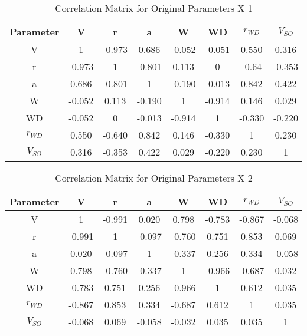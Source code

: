 \documentclass[11pt]{article} %
\begin{document}
\FloatBarrier
\begin{table}[hbt!]
\centering
\caption{ Correlation Matrix for Original Parameters X 1}
\begin{tabular}{c|c|c|c|c|c|c|c}
Parameter & V & r & a& W & WD& $r_{WD}$  &$ V_{SO}$\\
\hline
V & 1 & -0.973 &0.686 &-0.052 & -0.051 & 0.550 & 0.316\\
\hline
r & -0.973 & 1 & -0.801 & 0.113 & 0 &-0.64 & -0.353\\
\hline
a&0.686 & -0.801 & 1 & -0.190 & -0.013 & 0.842 &0.422\\
\hline
W&-0.052 &0.113 &-0.190 & 1 & -0.914 & 0.146 & 0.029\\
\hline
WD&-0.052 &0 & -0.013 & -0.914 & 1 & -0.330 & -0.220\\
\hline
$r_{WD}$&0.550 & -0.640 &  0.842 &0.146 & -0.330 & 1 & 0.230\\
\hline
$V_{SO}$&0.316&-0.353 & 0.422 &0.029 & -0.220 & 0.230  & 1
\end{tabular}
\end{table}
\FloatBarrier


\FloatBarrier
\begin{table}[hbt!]
\centering
\caption{ Correlation Matrix for Original Parameters X 2}
\begin{tabular}{c|c|c|c|c|c|c|c}
Parameter & V & r & a& W & WD& $r_{WD}$  &$ V_{SO}$\\
\hline
V & 1 & -0.991 &0.020 &0.798 & -0.783 & -0.867 & -0.068\\
\hline
r & -0.991 & 1 & -0.097 & -0.760 & 0.751 &0.853 & 0.069\\
\hline
a&0.020 & -0.097 & 1 & -0.337 & 0.256 & 0.334 &-0.058\\
\hline
W&0.798 &-0.760 &-0.337 & 1 & -0.966 & -0.687 & 0.032\\
\hline
WD&-0.783 &0.751 & 0.256 & -0.966 & 1 & 0.612 & 0.035\\
\hline
$r_{WD}$&-0.867 & 0.853 &  0.334 &-0.687 & 0.612 & 1 & 0.035\\
\hline
$V_{SO}$&-0.068&0.069 & -0.058 &-0.032 & 0.035 & 0.035  & 1
\end{tabular}
\end{table}
\FloatBarrier
\end{document}
